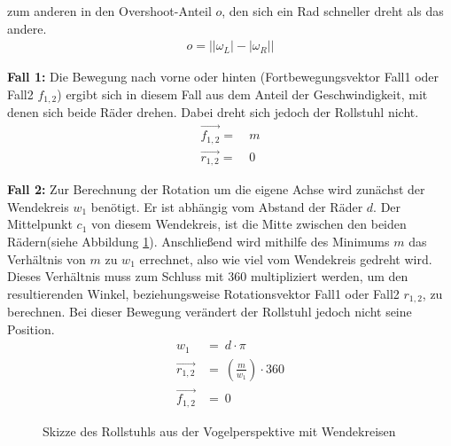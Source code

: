 zum anderen in den Overshoot-Anteil $o$, den sich ein Rad schneller dreht als das andere.
\begin{align}
    o = \left|\left| \omega_L \right|-\left| \omega_R\right| \right|
\end{align}

\textbf{Fall 1:}
Die Bewegung nach vorne oder hinten (Fortbewegungsvektor Fall1 oder Fall2 $f_{1,2}$) ergibt sich in diesem Fall aus dem Anteil der Geschwindigkeit, mit denen sich beide Räder drehen.
Dabei dreht sich jedoch der Rollstuhl nicht.
\begin{align}
    \vec{f_{1,2}} = & \ m \\
    \vec{r_{1,2}} = & \ 0
\end{align}

\textbf{Fall 2:}
Zur Berechnung der Rotation um die eigene Achse wird zunächst der Wendekreis $w_1$ benötigt.
Er ist abhängig vom Abstand der Räder $d$.
Der Mittelpunkt $c_1$ von diesem Wendekreis, ist die Mitte zwischen den beiden Rädern(siehe Abbildung \ref{fig:wendekreis}).
Anschließend wird mithilfe des Minimums $m$ das Verhältnis von $m$ zu $w_1$ errechnet, also wie viel vom Wendekreis gedreht wird.
Dieses Verhältnis muss zum Schluss mit $360$ multipliziert werden, um den resultierenden Winkel, beziehungsweise Rotationsvektor Fall1 oder Fall2 $r_{1,2}$, zu berechnen.
Bei dieser Bewegung verändert der Rollstuhl jedoch nicht seine Position.
\begin{align}
    w_1           & =            \ d \cdot \pi                  \\
    \vec{r_{1,2}} & =  \ \left(\frac {m} {w_1}\right) \cdot 360 \\
    \vec{f_{1,2}} & =  \ 0
\end{align}

\begin{figure}[h]
    \centering
    \caption{Skizze des Rollstuhls aus der Vogelperspektive mit Wendekreisen}
    \label{fig:wendekreis}
\end{figure}

